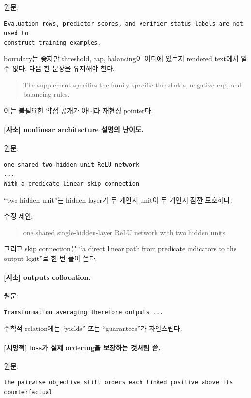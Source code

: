 \documentclass[11pt]{article}
\newcommand{\fatal}{\textbf{\textcolor{fatalred}{[치명적]}}}
\newcommand{\minor}{\textbf{\textcolor{minorblue}{[사소]}}}
\begin{document}
원문:
\begin{verbatim}
Evaluation rows, predictor scores, and verifier-status labels are not used to
construct training examples.
\end{verbatim}

boundary는 좋지만 threshold, cap, balancing이 어디에 있는지 rendered text에서 알 수
없다. 다음 한 문장을 유지해야 한다.

\begin{quote}
The supplement specifies the family-specific thresholds, negative cap, and
balancing rules.
\end{quote}

이는 불필요한 약점 공개가 아니라 재현성 pointer다.

\paragraph{\minor{} nonlinear architecture 설명의 난이도.}

원문:
\begin{verbatim}
one shared two-hidden-unit ReLU network
...
With a predicate-linear skip connection
\end{verbatim}

``two-hidden-unit''는 hidden layer가 두 개인지 unit이 두 개인지 잠깐 모호하다.

수정 제안:
\begin{quote}
one shared single-hidden-layer ReLU network with two hidden units
\end{quote}

그리고 skip connection은 ``a direct linear path from predicate indicators to
the output logit''로 한 번 풀어 쓴다.

\paragraph{\minor{} outputs collocation.}

원문:
\begin{verbatim}
Transformation averaging therefore outputs ...
\end{verbatim}

수학적 relation에는 ``yields'' 또는 ``guarantees''가 자연스럽다.

\paragraph{\fatal{} loss가 실제 ordering을 보장하는 것처럼 씀.}

원문:
\begin{verbatim}
the pairwise objective still orders each linked positive above its
counterfactual
\end{verbatim}
\end{document}
